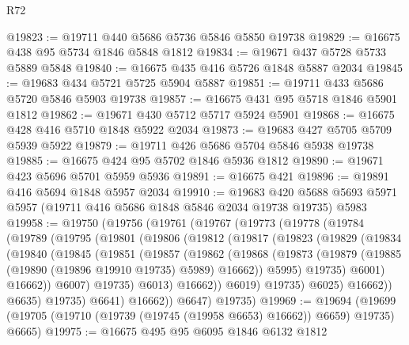 \begin{lexlean}{R72}
\begin{coremodule}
@19823 := @19711 @440 @5686 @5736 @5846 @5850 @19738
@19829 := @16675 @438 @95 @5734 @1846 @5848 @1812
@19834 := @19671 @437 @5728 @5733 @5889 @5848
@19840 := @16675 @435 @416 @5726 @1848 @5887 @2034
@19845 := @19683 @434 @5721 @5725 @5904 @5887
@19851 := @19711 @433 @5686 @5720 @5846 @5903 @19738
@19857 := @16675 @431 @95 @5718 @1846 @5901 @1812
@19862 := @19671 @430 @5712 @5717 @5924 @5901
@19868 := @16675 @428 @416 @5710 @1848 @5922 @2034
@19873 := @19683 @427 @5705 @5709 @5939 @5922
@19879 := @19711 @426 @5686 @5704 @5846 @5938 @19738
@19885 := @16675 @424 @95 @5702 @1846 @5936 @1812
@19890 := @19671 @423 @5696 @5701 @5959 @5936
@19891 := @16675 @421
@19896 := @19891 @416 @5694 @1848 @5957 @2034
@19910 := @19683
    @420
    @5688
    @5693
    @5971
    @5957
    (@19711 @416 @5686 @1848 @5846 @2034 @19738 @19735)
    @5983
@19958 := @19750
    (@19756
      (@19761
        (@19767
          (@19773
            (@19778
              (@19784
                (@19789
                  (@19795
                    (@19801
                      (@19806
                        (@19812
                          (@19817
                            (@19823
                              (@19829
                                (@19834
                                  (@19840
                                    (@19845
                                      (@19851
                                        (@19857
                                          (@19862
                                            (@19868
                                              (@19873
                                                (@19879
                                                  (@19885
                                                    (@19890 (@19896 @19910 @19735) @5989)
                                                    @16662))
                                                @5995)
                                              @19735)
                                            @6001)
                                          @16662))
                                      @6007)
                                    @19735)
                                  @6013)
                                @16662))
                            @6019)
                          @19735)
                        @6025)
                      @16662))
                  @6635)
                @19735)
              @6641)
            @16662))
        @6647)
      @19735)
@19969 := @19694
    (@19699 (@19705 (@19710 (@19739 (@19745 (@19958 @6653) @16662)) @6659) @19735) @6665)
@19975 := @16675 @495 @95 @6095 @1846 @6132 @1812

\end{coremodule}
\end{lexlean}
